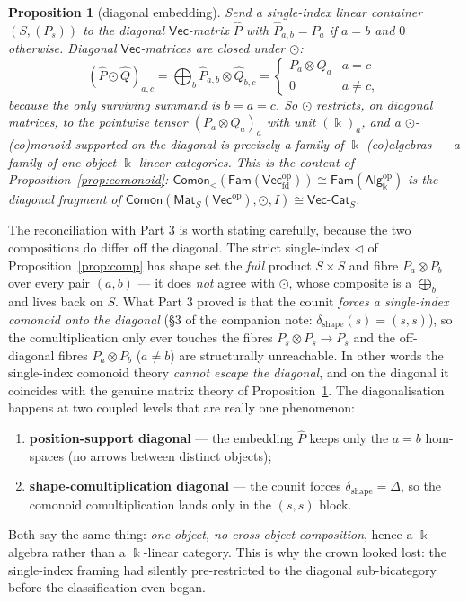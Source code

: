 \documentclass[11pt]{amsart}
\theoremstyle{plain}
\newtheorem{proposition}[theorem]{Proposition}
\theoremstyle{definition}
\renewcommand{\Vec}{\mathsf{Vec}}
\newcommand{\Fam}{\mathsf{Fam}}
\newcommand{\Comon}{\mathsf{Comon}}
\newcommand{\Alg}{\mathsf{Alg}}
\newcommand{\Mat}{\mathsf{Mat}}
\newcommand{\VCat}{\Vec\text{-}\mathsf{Cat}}
\newcommand{\op}{\mathrm{op}}
\newcommand{\fld}{\Bbbk}
\newcommand{\iso}{\cong}
\begin{document}
\begin{proposition}[diagonal embedding]\label{prop:diagonal}
Send a single-index linear container $(S,(P_s))$ to the \emph{diagonal}
$\Vec$-matrix $\widehat P$ with $\widehat P_{a,b}=P_a$ if $a=b$ and $0$ otherwise.
Diagonal $\Vec$-matrices are closed under $\odot$:
\[
  (\widehat P\odot\widehat Q)_{a,c}
  =\bigoplus_{b} \widehat P_{a,b}\otimes\widehat Q_{b,c}
  =\begin{cases}P_a\otimes Q_a & a=c\\ 0 & a\neq c,\end{cases}
\]
because the only surviving summand is $b=a=c$. So $\odot$ restricts, on diagonal
matrices, to the \emph{pointwise} tensor $(P_a\otimes Q_a)_{a}$ with unit
$(\fld)_a$, and a $\odot$-(co)monoid supported on the diagonal is precisely a family
of $\fld$-(co)algebras --- a family of \emph{one-object} $\fld$-linear categories.
This is the content of Proposition~\ref{prop:comonoid}:
$\Comon_\lhd(\Fam(\Vec_{\mathrm{fd}}^\op))\iso\Fam(\Alg_\fld^\op)$ is the diagonal
fragment of $\Comon(\Mat_S(\Vec^\op),\odot,I)\iso\VCat_S$.
\end{proposition}

The reconciliation with Part 3 is worth stating carefully, because the two
compositions do differ off the diagonal. The strict single-index $\lhd$ of
Proposition~\ref{prop:comp} has shape set the \emph{full} product $S\times S$ and
fibre $P_a\otimes P_b$ over every pair $(a,b)$ --- it does \emph{not} agree with
$\odot$, whose composite is a $\bigoplus_b$ and lives back on $S$. What Part 3
proved is that the counit \emph{forces a single-index comonoid onto the diagonal}
(\S3 of the companion note: $\delta_{\mathrm{shape}}(s)=(s,s)$), so the
comultiplication only ever touches the fibres $P_s\otimes P_s\to P_s$ and the
off-diagonal fibres $P_a\otimes P_b$ ($a\neq b$) are structurally unreachable. In
other words the single-index comonoid theory \emph{cannot escape the diagonal}, and
on the diagonal it coincides with the genuine matrix theory of
Proposition~\ref{prop:diagonal}. The diagonalisation happens at two coupled levels
that are really one phenomenon:
\begin{enumerate}[label=(\roman*)]
\item \textbf{position-support diagonal} --- the embedding $\widehat P$ keeps only
  the $a=b$ hom-spaces (no arrows between distinct objects);
\item \textbf{shape-comultiplication diagonal} --- the counit forces
  $\delta_{\mathrm{shape}}=\Delta$, so the comonoid comultiplication lands only in
  the $(s,s)$ block.
\end{enumerate}
Both say the same thing: \emph{one object, no cross-object composition}, hence a
$\fld$-algebra rather than a $\fld$-linear category. This is why the crown looked
lost: the single-index framing had silently pre-restricted to the diagonal
sub-bicategory before the classification even began.
\end{document}
